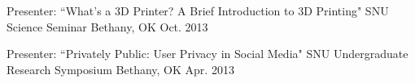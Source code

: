 \begin{cventries}
 \cventry
	{Presenter: ``What’s a 3D Printer? A Brief Introduction to 3D Printing" } %
	{SNU Science Seminar} %
	{Bethany, OK} %
	{Oct. 2013} %
	{
		\begin{cvitems} %
		\end{cvitems}
	}
	\vspace{-8.0mm}

 \cventry
	{Presenter: ``Privately Public: User Privacy in Social Media"} %
	{SNU Undergraduate Research Symposium} %
	{Bethany, OK} %
	{Apr. 2013} %
	{
		\begin{cvitems} %
		\end{cvitems}
	}
	\vspace{-8.0mm}

\end{cventries}
